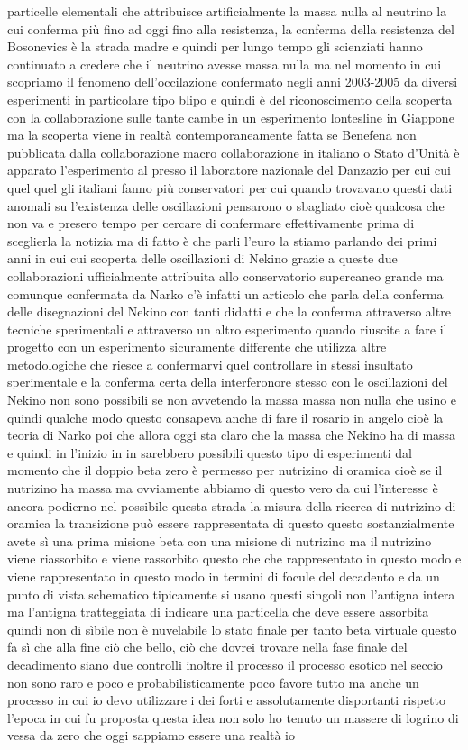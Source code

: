 particelle elementali che attribuisce artificialmente la massa nulla al neutrino la cui conferma più fino ad oggi fino alla resistenza, la conferma della resistenza del Bosonevics è la strada madre e quindi per lungo tempo gli scienziati hanno continuato a credere che il neutrino avesse massa nulla ma nel momento in cui scopriamo il fenomeno dell'occilazione confermato negli anni 2003-2005 da diversi esperimenti in particolare tipo blipo e quindi è del riconoscimento della scoperta con la collaborazione sulle tante cambe in un esperimento lontesline in Giappone ma la scoperta viene in realtà contemporaneamente fatta se Benefena non pubblicata dalla collaborazione macro collaborazione in italiano o Stato d'Unità è apparato l'esperimento al presso il laboratore nazionale del Danzazio per cui cui quel quel gli italiani fanno più conservatori per cui quando trovavano questi dati anomali su l'existenza delle oscillazioni pensarono o sbagliato cioè qualcosa che non va e presero tempo per cercare di confermare effettivamente prima di sceglierla la notizia ma di fatto è che parli l'euro la stiamo parlando dei primi anni in cui cui scoperta delle oscillazioni di Nekino grazie a queste due collaborazioni ufficialmente attribuita allo conservatorio supercaneo grande ma comunque confermata da Narko c'è infatti un articolo che parla della conferma delle disegnazioni del Nekino con tanti didatti e che la conferma attraverso altre tecniche sperimentali e attraverso un altro esperimento quando riuscite a fare il progetto con un esperimento sicuramente differente che utilizza altre metodologiche che riesce a confermarvi quel controllare in stessi insultato sperimentale e la conferma certa della interferonore stesso con le oscillazioni del Nekino non sono possibili se non avvetendo la massa massa non nulla che usino e quindi qualche modo questo consapeva anche di fare il rosario in angelo cioè la teoria di Narko poi che allora oggi sta claro che la massa che Nekino ha di massa e quindi in l'inizio in in sarebbero possibili questo tipo di esperimenti dal momento che il doppio beta zero è permesso per nutrizino di oramica cioè se il nutrizino ha massa ma ovviamente abbiamo di questo vero da cui l'interesse è ancora podierno nel possibile questa strada la misura della ricerca di nutrizino di oramica la transizione può essere rappresentata di questo questo sostanzialmente avete sì una prima misione beta con una misione di nutrizino ma il nutrizino viene riassorbito e viene rassorbito questo che che rappresentato in questo modo e viene rappresentato in questo modo in termini di focule del decadento e da un punto di vista schematico tipicamente si usano questi singoli non l'antigna intera ma l'antigna tratteggiata di indicare una particella che deve essere assorbita quindi non di sìbile non è nuvelabile lo stato finale per tanto beta virtuale questo fa sì che alla fine ciò che bello, ciò che dovrei trovare nella fase finale del decadimento siano due controlli inoltre il processo il processo esotico nel seccio non sono raro e poco e probabilisticamente poco favore tutto ma anche un processo in cui io devo utilizzare i dei forti e assolutamente disportanti rispetto l'epoca in cui fu proposta questa idea non solo ho tenuto un massere di logrino di vessa da zero che oggi sappiamo essere una realtà io 